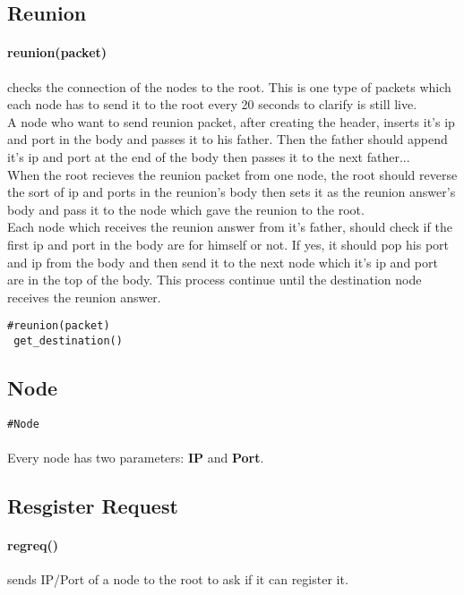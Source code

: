 \documentclass{article}
\begin{document}
\subsection{Reunion}
\paragraph{reunion(packet)} checks the connection of the nodes to the root. This is one type of packets which each node has to send it to the root every 20 seconds to clarify is still live. \\
A node who want to send reunion packet, after creating the header, inserts it's ip and port in the body and passes it to his father. Then the father should append it's ip and port at the end of the body then passes it to the next father... \\
When the root recieves the reunion packet from one node, the root should reverse the sort of ip and ports in the reunion's body then sets it as the reunion answer's body and pass it to the node which gave the reunion to the root. \\
Each node which receives the reunion answer from it's father, should check if the first ip and port in the body are for himself or not. If yes, it should pop his port and ip from the body and then send it to the next node which it's ip and port are in the top of the body.
This process continue until the destination node receives the reunion answer.
\begin{lstlisting}
#reunion(packet)
 get_destination()
\end{lstlisting}
\subsection{Node}
\begin{lstlisting}
#Node

\end{lstlisting}
\paragraph{}Every node has two parameters: \textbf{IP} and \textbf{Port}.
\subsection{Resgister Request}
\paragraph{reg\underline{\hspace{.05in}}req()} sends IP/Port of a node to the root to ask if it can register it. 
\end{document}
